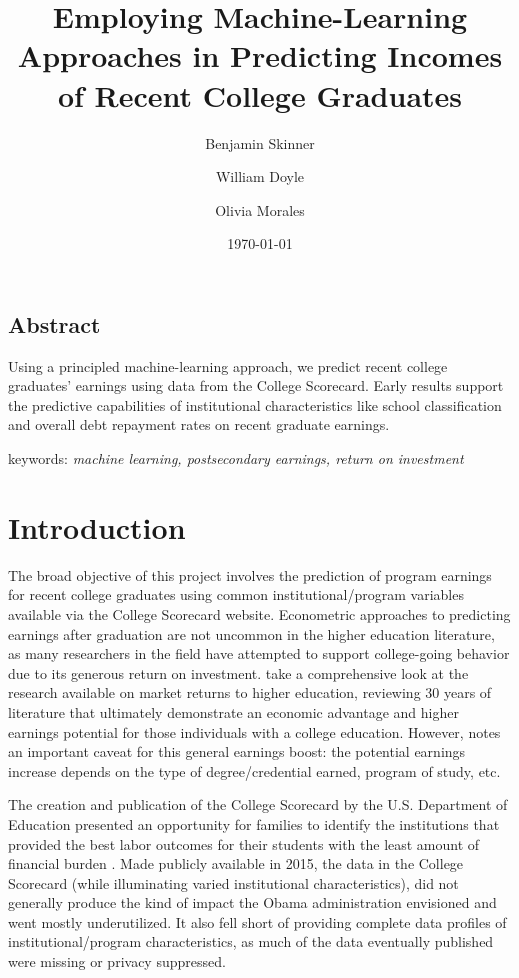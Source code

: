\documentclass[a4paper, 12pt]{article}
\title{Employing Machine-Learning Approaches in Predicting Incomes of Recent College Graduates}
\author[1]{Benjamin Skinner}
\author[2]{William Doyle}
\author[3]{Olivia Morales}
\affil[1, 3]{University of Florida}
\affil[2]{Vanderbilt University}
\date{\today}
\begin{document}
\maketitle

\doublespacing

\begin{center}
\section*{Abstract}
\end{center}

Using a principled machine-learning approach, we predict recent
college graduates' earnings using data from the College
Scorecard. Early results support the predictive capabilities of
institutional characteristics like school classification and overall
debt repayment rates on recent graduate earnings.

\vspace{5mm}

keywords: \emph{machine learning, postsecondary earnings, return on investment}


\section*{Introduction}

The broad objective of this project involves the prediction of program
earnings for recent college graduates using common
institutional/program variables available via the College Scorecard
website. Econometric approaches to predicting earnings after
graduation are not uncommon in the higher education literature, as
many researchers in the field have attempted to support college-going
behavior due to its generous return on
investment. \cite{Oreopoulous_Petronijevic_2013} take a comprehensive look
at the research available on market returns to higher education,
reviewing 30 years of literature that ultimately demonstrate an
economic advantage and higher earnings potential for those individuals
with a college education. However, \cite{Carnevale_etal_2011} notes an
important caveat for this general earnings boost: the potential
earnings increase depends on the type of degree/credential earned,
program of study, etc.

The creation and publication of the College Scorecard by the
U.S. Department of Education presented an opportunity for families to
identify the institutions that provided the best labor outcomes for
their students with the least amount of financial burden
\cite{obama_2013}. Made publicly available in 2015, the data in the
College Scorecard (while illuminating varied institutional
characteristics), did not generally produce the kind of impact the
Obama administration envisioned and went mostly underutilized. It also
fell short of providing complete data profiles of
institutional/program characteristics, as much of the data eventually
published were missing or privacy suppressed.
\end{document}
